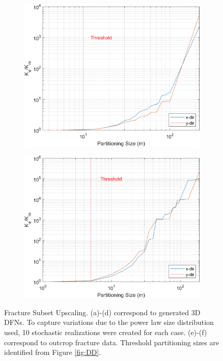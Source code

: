 \documentclass[main.tex]{subfiles}
\begin{document}
\begin{figure}[ht]
\begin{subfigure}{0.3\textwidth}
        \includegraphics[width=\textwidth]{FSU/Apodi2_FSU_nohead.png}
        \label{fig:FSU_A2}
    \end{subfigure}
    \begin{subfigure}{0.3\textwidth}
        \includegraphics[width=\textwidth]{FSU/Apodi4_FSU_nohead.png}
        \label{fig:FSU_A4}
    \end{subfigure}
    \caption{Fracture Subset Upscaling. (a)-(d) correspond to generated 3D DFNs. To capture variations due to the power law size distribution used, 10 stochastic realizations were created for each case. (e)-(f) correspond to outcrop fracture data. Threshold partitioning sizes are identified from Figure \ref{fig:DD}.}
    \label{fig:FSU}
\end{figure}
\end{document}
